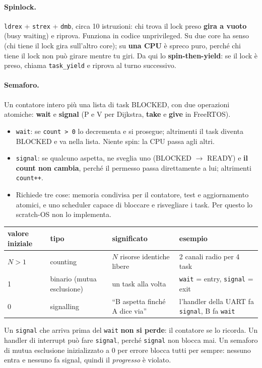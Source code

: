 \paragraph*{Spinlock.} \texttt{ldrex} + \texttt{strex} + \texttt{dmb}, circa 10 istruzioni: chi trova il lock preso \textbf{gira a vuoto} (busy waiting) e riprova. Funziona in codice unprivileged. Su due core ha senso (chi tiene il lock gira sull'altro core); su \textbf{una CPU} è spreco puro, perché chi tiene il lock non può girare mentre tu giri. Da qui lo \textbf{spin-then-yield}: se il lock è preso, chiama \texttt{task\_yield} e riprova al turno successivo.

\paragraph*{Semaforo.} Un contatore intero più una lista di task BLOCKED, con due operazioni atomiche: \textbf{wait} e \textbf{signal} (P e V per Dijkstra, \textbf{take} e \textbf{give} in FreeRTOS).
\begin{itemize}
    \item \texttt{wait}: se \texttt{count > 0} lo decrementa e si prosegue; altrimenti il task diventa BLOCKED e va nella lista. Niente spin: la CPU passa agli altri.
    \item \texttt{signal}: se qualcuno aspetta, ne sveglia uno (BLOCKED $\to$ READY) e \textbf{il count non cambia}, perché il permesso passa direttamente a lui; altrimenti \texttt{count++}.
    \item Richiede tre cose: memoria condivisa per il contatore, test e aggiornamento atomici, e uno scheduler capace di bloccare e risvegliare i task. Per questo lo scratch-OS non lo implementa.
\end{itemize}
\begin{center}
\small
\begin{tabular}{P{0.12} P{0.2} P{0.3} P{0.3}}
    \hline
    \textbf{valore iniziale} & \textbf{tipo} & \textbf{significato} & \textbf{esempio} \\
    \hline
    $N > 1$ & counting & $N$ risorse identiche libere & 2 canali radio per 4 task \\
    1 & binario (mutua esclusione) & un task alla volta & \texttt{wait} = entry, \texttt{signal} = exit \\
    0 & signalling & ``B aspetta finché A dice via'' & l'handler della UART fa \texttt{signal}, B fa \texttt{wait} \\
    \hline
\end{tabular}
\end{center}
Un \texttt{signal} che arriva prima del \texttt{wait} \textbf{non si perde}: il contatore se lo ricorda. Un handler di interrupt può fare \texttt{signal}, perché \texttt{signal} non blocca mai. Un semaforo di mutua esclusione inizializzato a 0 per errore blocca tutti per sempre: nessuno entra e nessuno fa signal, quindi il \emph{progresso} è violato.

